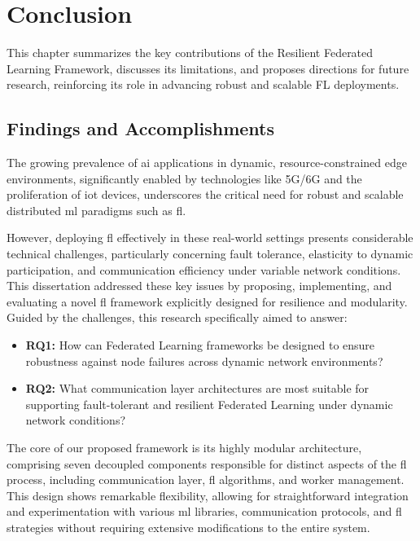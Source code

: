 \chapter{Conclusion}
\label{chap:conclusion}

\begin{introduction}

This chapter summarizes the key contributions of the Resilient Federated Learning Framework, discusses its limitations, and proposes directions for future research, reinforcing its role in advancing robust and scalable FL deployments.


\end{introduction}

\section{Findings and Accomplishments}

The growing prevalence of \ac{ai} applications in dynamic, resource-constrained edge environments, significantly enabled by technologies like 5G/6G and the proliferation of \ac{iot} devices, underscores the critical need for robust and scalable distributed \ac{ml} paradigms such as \ac{fl}.

However, deploying \ac{fl} effectively in these real-world settings presents considerable technical challenges, particularly concerning fault tolerance, elasticity to dynamic participation, and communication efficiency under variable network conditions. This dissertation addressed these key issues by proposing, implementing, and evaluating a novel \ac{fl} framework explicitly designed for resilience and modularity. Guided by the challenges, this research specifically aimed to answer:

\begin{itemize}
    \item \textbf{RQ1:} How can Federated Learning frameworks be designed to ensure robustness against node failures across dynamic network environments?
    \item \textbf{RQ2:} What communication layer architectures are most suitable for supporting fault-tolerant and resilient Federated Learning under dynamic network conditions?
\end{itemize}

The core of our proposed framework is its highly modular architecture, comprising seven decoupled components responsible for distinct aspects of the \ac{fl} process, including communication layer, \ac{fl} algorithms, and worker management. This design shows remarkable flexibility, allowing for straightforward integration and experimentation with various \ac{ml} libraries, communication protocols, and \ac{fl} strategies without requiring extensive modifications to the entire system. 

